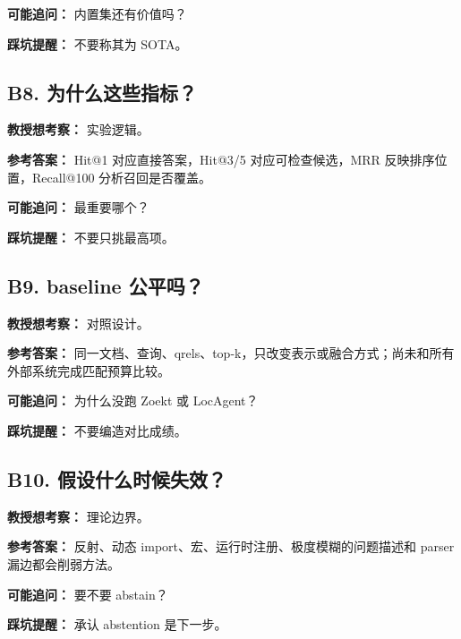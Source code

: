 \documentclass[UTF8,12pt,openany]{ctexbook}
\begin{document}
\textbf{可能追问：} 内置集还有价值吗？\par

\textbf{踩坑提醒：} 不要称其为 SOTA。\par

\subsection{B8. 为什么这些指标？}

\textbf{教授想考察：} 实验逻辑。\par

\textbf{参考答案：} Hit@1 对应直接答案，Hit@3/5 对应可检查候选，MRR 反映排序位置，Recall@100 分析召回是否覆盖。\par

\textbf{可能追问：} 最重要哪个？\par

\textbf{踩坑提醒：} 不要只挑最高项。\par

\subsection{B9. baseline 公平吗？}

\textbf{教授想考察：} 对照设计。\par

\textbf{参考答案：} 同一文档、查询、qrels、top-k，只改变表示或融合方式；尚未和所有外部系统完成匹配预算比较。\par

\textbf{可能追问：} 为什么没跑 Zoekt 或 LocAgent？\par

\textbf{踩坑提醒：} 不要编造对比成绩。\par

\subsection{B10. 假设什么时候失效？}

\textbf{教授想考察：} 理论边界。\par

\textbf{参考答案：} 反射、动态 import、宏、运行时注册、极度模糊的问题描述和 parser 漏边都会削弱方法。\par

\textbf{可能追问：} 要不要 abstain？\par

\textbf{踩坑提醒：} 承认 abstention 是下一步。\par
\end{document}
